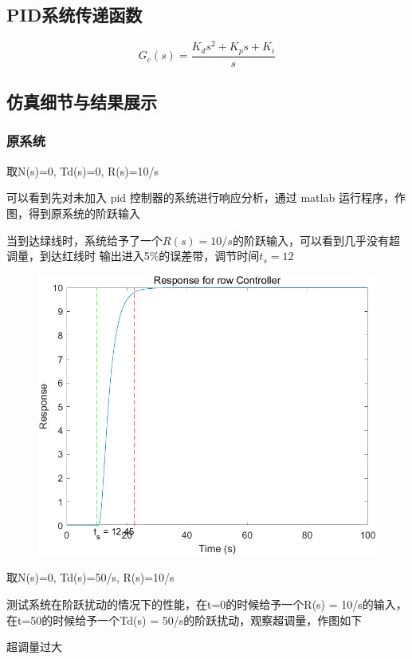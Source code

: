 \documentclass{thuemp}
\begin{document}
\subsection{PID系统传递函数}
$$
G_c\left(s\right)=\frac{K_ds^2+K_ps+K_i}{s}
$$

\subsection{仿真细节与结果展示}
\subsubsection{原系统}
取N(s)=0, Td(s)=0, R(s)=10/s

可以看到先对未加入 pid 控制器的系统进行响应分析，通过 matlab 运行程序，作图，得到原系统的阶跃输入

当到达绿线时，系统给予了一个$R(s)=10/s$的阶跃输入，可以看到几乎没有超调量，到达红线时
输出进入5\%的误差带，调节时间$t_s = 12$
\begin{figure}[H]
\centering
\includegraphics[width=1\linewidth]{./img/None_p1_R.png}
\end{figure}

取N(s)=0, Td(s)=50/s, R(s)=10/s

测试系统在阶跃扰动的情况下的性能，在t=0的时候给予一个R(s) = 10/s的输入，
在t=50的时候给予一个Td(s) = 50/s的阶跃扰动，观察超调量，作图如下

超调量过大
\end{document}
